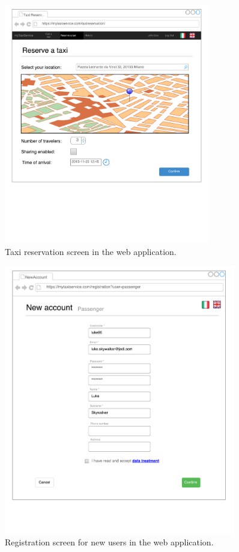 \begin{figure}[h]
\centering
\includegraphics[width=0.8\textwidth]{mockup/web/TaxiReservationBrowser}
\caption{Taxi reservation screen in the web application.}
\label{fig:mockup-reservation-browser}
\end{figure}

\begin{figure}[h]
\centering
\includegraphics[width=0.9\textwidth]{mockup/web/Registration}
\caption{Registration screen for new users in the web application.}
\label{fig:mockup-registration}
\end{figure}

